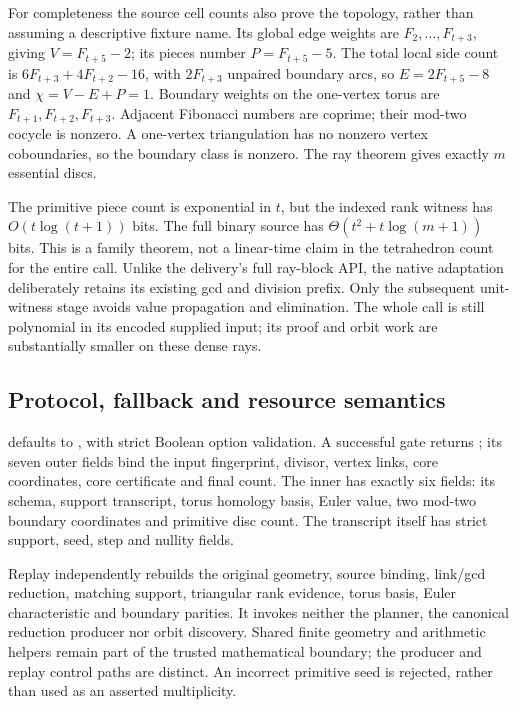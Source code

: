 For completeness the source cell counts also prove the topology, rather
than assuming a descriptive fixture name. Its global edge weights are
$F_2,\ldots,F_{t+3}$, giving $V=F_{t+5}-2$; its pieces number
$P=F_{t+5}-5$. The total local side count is
$6F_{t+3}+4F_{t+2}-16$, with $2F_{t+3}$ unpaired boundary arcs, so
$E=2F_{t+5}-8$ and $\chi=V-E+P=1$. Boundary weights on the one-vertex
torus are $F_{t+1},F_{t+2},F_{t+3}$. Adjacent Fibonacci numbers are coprime;
their mod-two cocycle is nonzero. A one-vertex triangulation has no nonzero
vertex coboundaries, so the boundary class is nonzero. The ray theorem
gives exactly $m$ essential discs.

The primitive piece count is exponential in $t$, but the indexed rank
witness has $O(t\log(t+1))$ bits. The full binary source has
$\Theta(t^2+t\log(m+1))$ bits. This is a family theorem, not a linear-time
claim in the tetrahedron count for the entire call. Unlike the delivery's
full ray-block API, the native adaptation deliberately retains its existing
gcd and division prefix. Only the subsequent unit-witness stage avoids
value propagation and elimination. The whole call is still polynomial in
its encoded supplied input; its proof and orbit work are substantially
smaller on these dense rays.

\subsection{Protocol, fallback and resource semantics}

 defaults to
, with strict Boolean option validation. A successful
gate returns ; its seven outer fields bind the
input fingerprint, divisor, vertex links, core coordinates, core certificate
and final count. The inner  has exactly six
fields: its schema, support transcript, torus homology basis, Euler value,
two mod-two boundary coordinates and primitive disc count. The transcript
itself has strict support, seed, step and nullity fields.

Replay independently rebuilds the original geometry, source binding,
link/gcd reduction, matching support, triangular rank evidence, torus basis,
Euler characteristic and boundary parities. It invokes neither the planner,
the canonical reduction producer nor orbit discovery. Shared finite geometry
and arithmetic helpers remain part of the trusted mathematical boundary;
the producer and replay control paths are distinct. An incorrect primitive
seed is rejected, rather than used as an asserted multiplicity.

